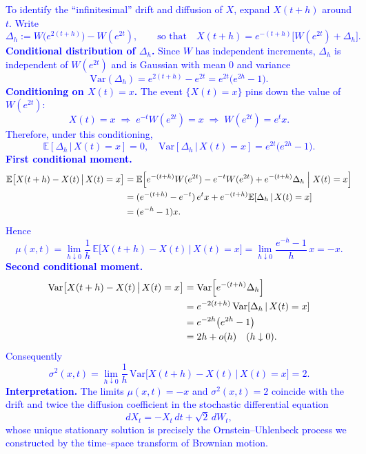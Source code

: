 \documentclass{article}
\begin{document}
\begin{enumerate}
    \textcolor{blue}{
To identify the “infinitesimal” drift and diffusion of $X$, expand $X(t+h)$ around $t$.  Write  
$$
\Delta_h:=W\!\bigl(e^{2(t+h)}\bigr)-W(e^{2t}),
\qquad\text{so that}\quad
X(t+h)=e^{-(t+h)}\bigl[W(e^{2t})+\Delta_h\bigr].
$$
\textbf{Conditional distribution of $\Delta_h$.}  Since $W$ has independent increments, $\Delta_h$ is independent of $W(e^{2t})$ and is Gaussian with mean $0$ and variance  
$$
\mathrm{Var}(\Delta_h)=e^{2(t+h)}-e^{2t}=e^{2t}\bigl(e^{2h}-1\bigr).
$$
\textbf{Conditioning on $X(t)=x$.}  The event $\{X(t)=x\}$ pins down the value of $W(e^{2t})$:  
$$
X(t)=x
\;\Longrightarrow\;
e^{-t}W(e^{2t})=x
\;\Longrightarrow\;
W(e^{2t})=e^{t}x.
$$
Therefore, under this conditioning,
$$
\mathbb{E}[\Delta_h\,|\,X(t)=x]=0,
\quad
\mathrm{Var}[\Delta_h\,|\,X(t)=x]=e^{2t}\bigl(e^{2h}-1\bigr).
$$
\textbf{First conditional moment.}  
\[
\begin{aligned}
\mathbb{E}\bigl[X(t+h)-X(t)\,\big|\,X(t)=x\bigr]
&=\mathbb{E}\Bigl[e^{-(t+h)}W(e^{2t})-e^{-t}W(e^{2t})
                 +e^{-(t+h)}\Delta_h\;\Big|\;X(t)=x\Bigr]\\
&=(e^{-(t+h)}-e^{-t})\,e^{t}x+e^{-(t+h)}\mathbb{E}[\Delta_h\,|\,X(t)=x]\\
&=(e^{-h}-1)x.
\end{aligned}
\]
Hence  
$$
\mu(x,t)
=\lim_{h\downarrow 0}\frac{1}{h}\,\mathbb{E}\bigl[X(t+h)-X(t)\,|\,X(t)=x\bigr]
=\lim_{h\downarrow 0}\frac{e^{-h}-1}{h}\,x
=-x.
$$
\textbf{Second conditional moment.}  
\[
\begin{aligned}
\mathrm{Var}\bigl[X(t+h)-X(t)\,\big|\,X(t)=x\bigr]
&=\mathrm{Var}\Bigl[e^{-(t+h)}\Delta_h\Bigr]\\
&=e^{-2(t+h)}\,\mathrm{Var}[\Delta_h\,|\,X(t)=x]\\
&=e^{-2h}\bigl(e^{2h}-1\bigr)\\
&=2h+o(h)\quad(h\downarrow 0).
\end{aligned}
\]
Consequently  
$$
\sigma^{2}(x,t)
=\lim_{h\downarrow 0}\frac{1}{h}\,
\mathrm{Var}\bigl[X(t+h)-X(t)\,|\,X(t)=x\bigr]
=2.
$$
\textbf{Interpretation.}  The limits $\mu(x,t)=-x$ and $\sigma^{2}(x,t)=2$ coincide with the drift and twice the diffusion coefficient in the stochastic differential equation  
$$
dX_t=-X_t\,dt+\sqrt{2}\,dW_t^{\phantom{.}},
$$
whose unique stationary solution is precisely the Ornstein–Uhlenbeck process we constructed by the time–space transform of Brownian motion.
    }

\end{enumerate}
\end{document}

